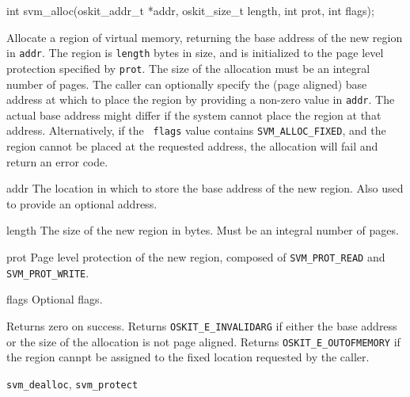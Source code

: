 \begin{apisyn}

	\funcproto int svm_alloc(oskit_addr_t *addr, oskit_size_t length,
                                 int prot, int flags);
\end{apisyn}
\begin{apidesc}
	Allocate a region of virtual memory, returning the base address of
	the new region in {\tt addr}. The region is {\tt length} bytes in
	size, and is initialized to the page level protection specified by
	{\tt prot}. The size of the allocation must be an integral number
	of pages. The caller can optionally specify the (page aligned) base
	address at which to place the region by providing a non-zero value
	in {\tt addr}. The actual base address might differ if the system
	cannot place the region at that address. Alternatively, if the {\tt
	flags} value contains {\tt SVM_ALLOC_FIXED}, and the region cannot
	be placed at the requested address, the allocation will fail and
	return an error code.
\end{apidesc}
\begin{apiparm}
	\item[addr]
		The location in which to store the base address of the new
		region. Also used to provide an optional address.
	\item[length]
		The size of the new region in bytes. Must be an integral
		number of pages.
	\item[prot]
		Page level protection of the new region, composed of
		{\tt SVM_PROT_READ} and {\tt SVM_PROT_WRITE}.
	\item[flags]
		Optional flags.
\end{apiparm}
\begin{apiret}
	Returns zero on success. Returns {\tt OSKIT_E_INVALIDARG} if either
	the base address or the size of the allocation is not page aligned.
	Returns {\tt OSKIT_E_OUTOFMEMORY} if the region cannpt be assigned
	to the fixed location requested by the caller.
\end{apiret}
\begin{apirel}
	{\tt svm_dealloc}, {\tt svm_protect}
\end{apirel}


